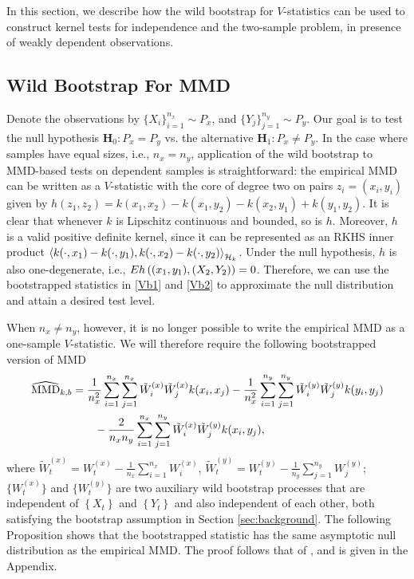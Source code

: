 In this section, we describe how the wild bootstrap for $V$-statistics can be used to construct kernel tests for independence and the two-sample problem, in presence of weakly dependent observations.

\subsection{Wild Bootstrap For MMD}
Denote the observations by $\{X_i\}_{i=1}^{n_x}\sim P_x$, and $\{Y_j\}_{j=1}^{n_y}\sim P_y$. Our goal is to test the null hypothesis $\mathbf H_0: P_x=P_y$ vs. 
the alternative $\mathbf H_1: P_x\neq P_y$. In the case where samples have equal sizes, i.e., $n_x=n_y$, application of the wild bootstrap to MMD-based tests on dependent samples is straightforward: the empirical MMD can be written as a $V$-statistic with the core of degree two on pairs $z_i=(x_i,y_i)$ given by $h(z_1,z_2) = k(x_1,x_2)- k(x_1,y_2) - k(x_2,y_1) + k(y_1,y_2)$. It is clear that whenever $k$ is Lipschitz continuous and bounded, so is $h$. Moreover, $h$ is a valid positive definite kernel, since it can be represented as an RKHS inner product  $\left\langle k(\cdot, x_1) -k(\cdot, y_1),k(\cdot, x_2) -k(\cdot, y_2) \right\rangle_{\mathcal{H}_k}$. Under the null hypothesis, $h$ is also one-degenerate, i.e., $E h\left((x_1,y_1),(X_2,Y_2)\right) = 0$. Therefore, we can use the bootstrapped statistics in \eqref{Vb1} and \eqref{Vb2} to approximate the null distribution and attain a desired test level.

When $n_x\neq n_y$, however, it is no longer possible to write the empirical MMD
as a one-sample $V$-statistic. We will therefore require the following bootstrapped version of MMD
\begin{align}
\widehat{\text{MMD}}_{k,b}&=\frac{1}{n_x^2}\sum_{i=1}^{n_x}\sum_{j=1}^{n_x}\tilde W_i^{(x)}\tilde W_j^{(x)}k(x_i,x_j)-\frac{1}{n_x^2}\sum_{i=1}^{n_y}\sum_{j=1}^{n_y}\tilde W_i^{(y)}\tilde W_j^{(y)}k(y_i,y_j)\notag\\
{}&\qquad-\frac{2}{n_x n_y}\sum_{i=1}^{n_x}\sum_{j=1}^{n_y}\tilde W_i^{(x)}\tilde W_j^{(y)}k(x_i,y_j),\label{eq:mmdkb}
\end{align}
where $\tilde W_t^{(x)}=W_t^{(x)}-\frac{1}{n_x}\sum_{i=1}^{n_x}W_i^{(x)}$, $\tilde W_t^{(y)}=W_t^{(y)}-\frac{1}{n_y}\sum_{j=1}^{n_y}W_j^{(y)}$;  $\{W_t^{(x)}\}$ and $\{W_t^{(y)}\}$ are two auxiliary wild bootstrap processes that are independent of $\left\{ X_t \right\}$ and $\left\{ Y_t \right\}$ and also independent of each other, both satisfying the bootstrap assumption in Section \ref{sec:background}.  
The following Proposition shows that the bootstrapped statistic has the same asymptotic null distribution as the empirical MMD. The proof follows that of \cite[Theorem 3.1]{leucht_dependent_2013}, and is given in the Appendix.

